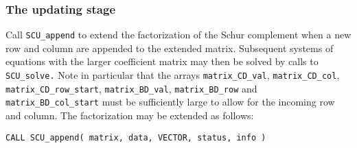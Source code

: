 \documentclass{galahad}
\newcommand{\packagename}{SCU}
\begin{document}

\subsubsection{The updating stage}
Call {\tt \packagename\_append} to extend the factorization of the Schur 
complement when a new row and column are appended to the 
extended matrix. Subsequent systems of equations with the larger 
coefficient matrix may then be solved by calls to {\tt \packagename\_solve.} 
Note in particular that the arrays {\tt matrix\_CD\_val}, 
{\tt matrix\_CD\_col}, {\tt matrix\_CD\_row\_start}, {\tt matrix\_BD\_val},  
{\tt matrix\_BD\_row} and {\tt matrix\_BD\_col\_start} 
must be sufficiently large to allow for the incoming row and column. 
The factorization may be extended as follows:
\vspace*{1mm}

\hskip0.5in 
{\tt CALL \packagename\_append( matrix, data, VECTOR, status, info )}
\end{document}
